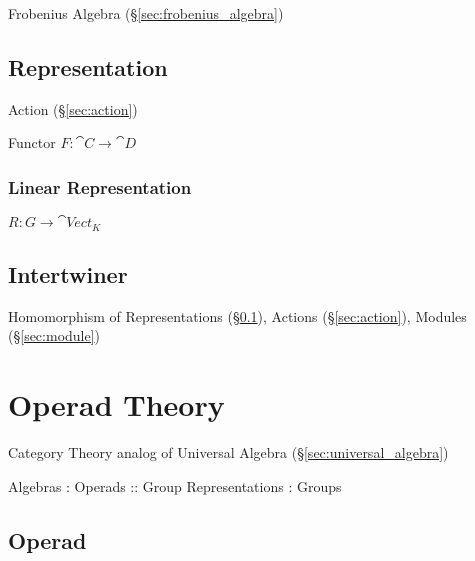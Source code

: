 Frobenius Algebra (\S\ref{sec:frobenius_algebra})



\subsection{Representation}\label{sec:representation}

Action (\S\ref{sec:action})

Functor $F : \cat{C} \rightarrow \cat{D}$



\subsubsection{Linear Representation}\label{sec:linear_representation}

$R : G \rightarrow \cat{Vect}_K$



\subsection{Intertwiner}\label{sec:intertwiner}

Homomorphism of Representations (\S\ref{sec:representation}), Actions
(\S\ref{sec:action}), Modules (\S\ref{sec:module})



\section{Operad Theory}\label{sec:operad_theory}

Category Theory analog of Universal Algebra
(\S\ref{sec:universal_algebra})

Algebras : Operads :: Group Representations : Groups



\subsection{Operad}\label{sec:operad}


